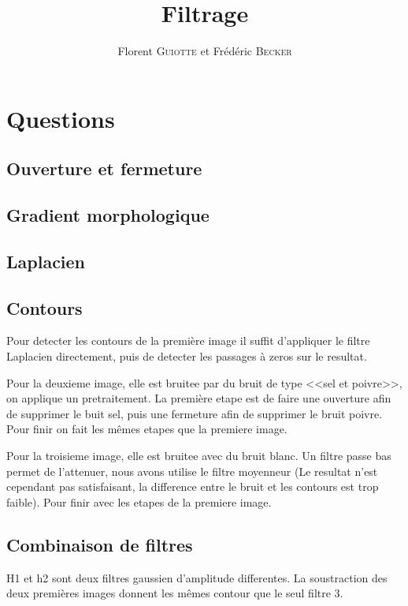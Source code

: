 \documentclass{article}
\author{Florent \textsc{Guiotte} et Frédéric \textsc{Becker}}
\title{Filtrage}
\begin{document}
\maketitle
\tableofcontents

\section{Questions}
\subsection{Ouverture et fermeture}

\subsection{Gradient morphologique}

\subsection{Laplacien}

\subsection{Contours}
Pour detecter les contours de la première image il suffit d'appliquer le filtre Laplacien directement, puis de detecter
les passages à zeros sur le resultat.

Pour la deuxieme image, elle est bruitee par du bruit de type <<sel et poivre>>, on applique un pretraitement. La première etape est de faire une
ouverture afin de supprimer le buit sel, puis une fermeture afin de supprimer le bruit poivre. Pour finir on fait les
mêmes etapes que la
premiere image.

Pour la troisieme image, elle est bruitee avec du bruit blanc. Un filtre passe bas permet de l'attenuer, nous avons
utilise le filtre moyenneur (Le resultat n'est cependant pas satisfaisant, la difference entre le bruit et les contours
est trop faible). Pour finir avec les etapes de la premiere image.
\subsection{Combinaison de filtres}

H1 et h2 sont deux filtres gaussien d'amplitude differentes. La soustraction des deux premières images donnent les mêmes
contour que le seul filtre 3. 
\end{document}
